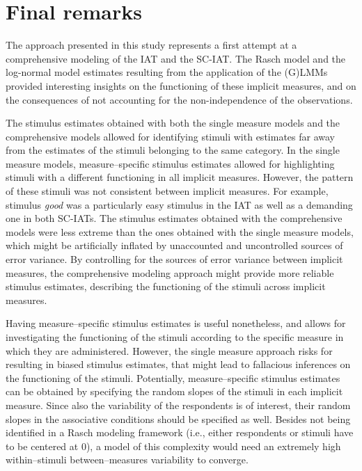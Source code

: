 \documentclass[12pt]{book}
\begin{document}
\section{Final remarks}

The approach presented in this study represents a first attempt at a comprehensive modeling of the IAT and the SC-IAT. 
The Rasch model and the log-normal model estimates resulting from the application of the (G)LMMs provided interesting insights on the functioning of these implicit measures, and on the consequences of not accounting for the non-independence of the observations. 

The stimulus estimates obtained with both the single measure models and the comprehensive models allowed for identifying stimuli with estimates far away from the estimates of the stimuli belonging to the same category. In the single measure models, measure--specific stimulus estimates allowed for highlighting stimuli with a different functioning in all implicit measures. However, the pattern of these stimuli was not consistent between implicit measures. 
For example,  stimulus \emph{good} was a particularly easy stimulus in the IAT as well as a demanding one in both SC-IATs.  
The stimulus estimates obtained with the comprehensive models were less extreme than the ones obtained with the single measure models, which might  be artificially inflated by unaccounted and uncontrolled sources of error variance. 
By controlling for the sources of error variance between implicit measures,  the comprehensive modeling approach might provide more reliable stimulus estimates, describing the functioning of the stimuli across implicit measures.

Having measure--specific stimulus estimates is useful nonetheless, and allows for investigating the functioning of the stimuli according to the specific measure in which they are administered. 
However, the single measure approach risks for resulting in biased stimulus estimates, that might lead to fallacious inferences on the functioning of the stimuli. 
Potentially, measure--specific stimulus estimates can be obtained by specifying the random slopes of the stimuli in  each implicit measure. 
Since also the variability of the respondents is of interest, their random slopes in the associative conditions should be specified as well. 
Besides not being identified in a Rasch modeling framework (i.e., either respondents or stimuli have to be centered at 0), a model of this complexity would need an extremely high within--stimuli between--measures variability to converge.
\end{document}
